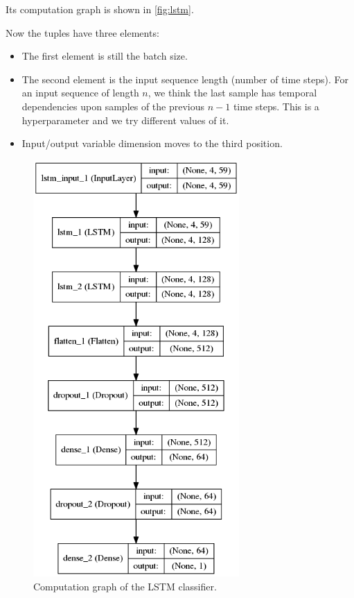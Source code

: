 \documentclass[11pt,a4paper]{report}
\begin{document}
Its computation graph is shown in \autoref{fig:lstm}.

Now the tuples have three elements:

\begin{itemize}
  \item The first element is still the batch size.
  \item The second element is the input sequence length (number of time steps).
    For an input sequence of length \(n\), we think the last sample has temporal dependencies upon samples of the previous \(n-1\) time steps.
    This is a hyperparameter and we try different values of it.
  \item Input/output variable dimension moves to the third position.
\end{itemize}

\begin{figure}[htbp]
  \centering
  \includegraphics[width=0.7\textwidth]{model-lstm.png}
  \caption{Computation graph of the LSTM classifier.} \label{fig:lstm}
\end{figure}
\end{document}
